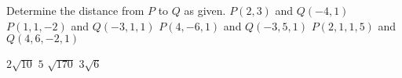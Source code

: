 
\begin{Exercise}[
name={},
title={}, 
difficulty=0,
origin={\cite{SM}}]
Determine the distance from $P$ to $Q$ as given.
\Question $P(2,3)$ and $Q(-4,1)$
\Question $P(1,1,-2)$ and $Q(-3,1,1)$
\Question $P(4,-6,1)$ and $Q(-3,5,1)$
\Question $P(2,1,1,5)$ and $Q(4,6,-2,1)$
\end{Exercise}

\begin{Answer}
\Question $2\sqrt{10}$
\Question $5$
\Question $\sqrt{170}$
\Question $3\sqrt{6}$
\end{Answer}
